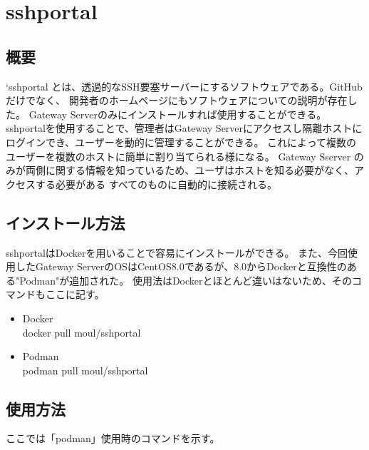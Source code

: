 \documentclass[11pt,a4j,titlepage]{jreport}
\begin{document}
\section{sshportal}\label{sshportal}

\subsection*{概要}
`sshportal \cite{sshportal} とは、透過的なSSH要塞サーバーにするソフトウェアである。GitHubだけでなく、
開発者のホームページにもソフトウェアについての説明が存在した\cite{sshportalpage}。
Gateway Serverのみにインストールすれば使用することができる。
sshportalを使用することで、管理者はGateway Serverにアクセスし隔離ホストにログインでき、ユーザーを動的に管理することができる。
これによって複数のユーザーを複数のホストに簡単に割り当てられる様になる。
Gateway Sserver のみが両側に関する情報を知っているため、ユーザはホストを知る必要がなく、アクセスする必要がある
すべてのものに自動的に接続される。




\subsection*{インストール方法}
sshportalはDockerを用いることで容易にインストールができる。
また、今回使用したGateway ServerのOSはCentOS8.0であるが、8.0からDockerと互換性のある"Podman"が追加された。
使用法はDockerとほとんど違いはないため、そのコマンドもここに記す。

\begin{itemize}
    \item Docker\mbox{}\\docker pull moul/sshportal
    \item Podman\mbox{}\\podman pull moul/sshportal
\end{itemize}

\subsection*{使用方法}
ここでは「podman」使用時のコマンドを示す。
\end{document}
